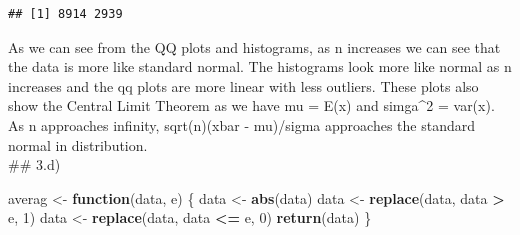 \documentclass[
]{article}
\newenvironment{Shaded}{\begin{snugshade}}{\end{snugshade}}
\newcommand{\ControlFlowTok}[1]{\textcolor[rgb]{0.13,0.29,0.53}{\textbf{#1}}}
\newcommand{\DecValTok}[1]{\textcolor[rgb]{0.00,0.00,0.81}{#1}}
\newcommand{\KeywordTok}[1]{\textcolor[rgb]{0.13,0.29,0.53}{\textbf{#1}}}
\newcommand{\NormalTok}[1]{#1}
\newcommand{\OperatorTok}[1]{\textcolor[rgb]{0.81,0.36,0.00}{\textbf{#1}}}
\newcommand{\StringTok}[1]{\textcolor[rgb]{0.31,0.60,0.02}{#1}}
\begin{document}
\begin{verbatim}
## [1] 8914 2939
\end{verbatim}

As we can see from the QQ plots and histograms, as n increases we can
see that the data is more like standard normal. The histograms look more
like normal as n increases and the qq plots are more linear with less
outliers. These plots also show the Central Limit Theorem as we have mu
= E(x) and simga\^{}2 = var(x). As n approaches infinity, sqrt(n)(xbar -
mu)/sigma approaches the standard normal in distribution.\\
\#\# 3.d)

\begin{Shaded}
\begin{Highlighting}[]
\NormalTok{averag <-}\StringTok{ }\ControlFlowTok{function}\NormalTok{(data, e) \{}
\NormalTok{  data <-}\StringTok{ }\KeywordTok{abs}\NormalTok{(data)}
\NormalTok{  data <-}\StringTok{ }\KeywordTok{replace}\NormalTok{(data, data }\OperatorTok{>}\StringTok{ }\NormalTok{e, }\DecValTok{1}\NormalTok{)}
\NormalTok{  data <-}\StringTok{ }\KeywordTok{replace}\NormalTok{(data, data }\OperatorTok{<=}\StringTok{ }\NormalTok{e, }\DecValTok{0}\NormalTok{)}
  \KeywordTok{return}\NormalTok{(data)}
\NormalTok{\}}
\end{Highlighting}
\end{Shaded}
\end{document}
